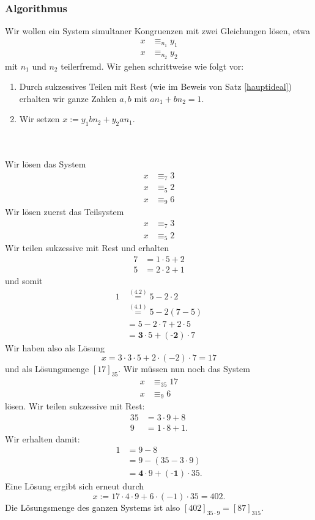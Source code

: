 \subsubsection{Algorithmus}

Wir wollen ein System simultaner Kongruenzen mit zwei Gleichungen lösen, etwa
\begin{align*}
x&\equiv_{n_1} y_1\\
x&\equiv_{n_2} y_2
\end{align*}
mit $n_1$ und $n_2$ teilerfremd. Wir gehen schrittweise wie folgt vor:
 \begin{enumerate}
  \item Durch sukzessives Teilen mit Rest (wie im Beweis von Satz \ref{hauptideal}) erhalten wir ganze Zahlen $a,b$ mit $an_1+bn_2=1$.
\item Wir setzen $x:=y_1bn_2+y_2an_1$.
 \end{enumerate}

\\
\\

 Wir lösen das System
\begin{align*}
x&\equiv_{7} 3\\
x&\equiv_{5} 2\\
x&\equiv_{9} 6
\end{align*}
Wir lösen zuerst das Teilsystem
\begin{align*}
 x&\equiv_{7} 3\\
x&\equiv_{5} 2
\end{align*}
Wir teilen sukzessive mit Rest und erhalten
\begin{align}
 7&=1\cdot 5+2\\
5&=2\cdot 2+1
\end{align}
und somit
\begin{align*}
1&\stackrel{(4.2)}{=}5-2\cdot 2\\
&\stackrel{(4.1)}{=}5-2(7-5)\\
&=5-2\cdot7+2\cdot5\\
&=\textbf{3}\cdot 5+(\textbf{-2})\cdot 7
\end{align*}
Wir haben also als Lösung
\[
 x=3\cdot 3\cdot 5+2\cdot(-2)\cdot 7=17
\]
und als Lösungsmenge $[17]_{35}$. Wir müssen nun noch das System
\begin{align*}
x&\equiv_{35} 17\\
x&\equiv_{9} 6
\end{align*}
lösen. Wir teilen sukzessive mit Rest:
\begin{align*}
 35&=3\cdot 9+8\\
9&=1\cdot 8+1.
\end{align*}
Wir erhalten damit:
\begin{align*}
 1&=9-8\\
&=9-(35-3\cdot 9)\\
&=\textbf{4}\cdot 9+(\textbf{-1})\cdot 35.
\end{align*}
Eine Lösung ergibt sich erneut durch
\[
 x:=17\cdot4\cdot9+6\cdot(-1)\cdot35=402.
\]
Die Lösungsmenge des ganzen Systems ist also $[402]_{35\cdot9}=[87]_{315}$.

